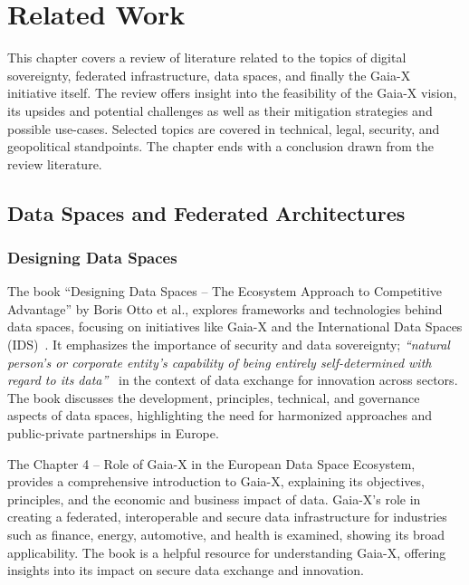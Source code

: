 \chapter{Related Work}\label{ch:related-work-two}

\begin{chapterabstract}
    This chapter covers a review of literature related to the topics of digital sovereignty, federated infrastructure, data spaces, and finally the Gaia-X initiative itself.
    The review offers insight into the feasibility of the Gaia-X vision, its upsides and potential challenges as well as their mitigation strategies and possible use-cases.
    Selected topics are covered in technical, legal, security, and geopolitical standpoints.
    The chapter ends with a conclusion drawn from the review literature.
\end{chapterabstract}

\section{Data Spaces and Federated Architectures}\label{sec:data-spaces-and-federated-architectures}
\subsection{Designing Data Spaces}\label{subsec:designing-data-spaces}

The book ``Designing Data Spaces -- The Ecosystem Approach to Competitive Advantage'' by Boris Otto et al., explores frameworks and technologies behind data spaces, focusing on initiatives like Gaia-X and the International Data Spaces (IDS)~\cite{designing_dataspaces}.
It emphasizes the importance of security and data sovereignty; \textit{``natural person’s or corporate entity’s capability of being entirely self-determined with regard to its data''}~\cite{designing_dataspaces} in the context of data exchange for innovation across sectors.
The book discusses the development, principles, technical, and governance aspects of data spaces, highlighting the need for harmonized approaches and public-private partnerships in Europe.

The Chapter 4 -- Role of Gaia-X in the European Data Space Ecosystem, provides a comprehensive introduction to Gaia-X, explaining its objectives, principles, and the economic and business impact of data.
Gaia-X's role in creating a federated, interoperable and secure data infrastructure for industries such as finance, energy, automotive, and health is examined, showing its broad applicability.
The book is a helpful resource for understanding Gaia-X, offering insights into its impact on secure data exchange and innovation.

